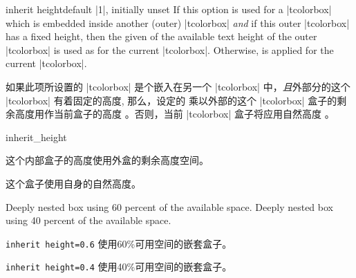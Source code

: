 \begin{docTcbKey}[][doc new={2017-06-28}]{inherit height}{}{default |1|, initially unset}
If this option is used for a |tcolorbox| which is embedded inside
another (outer) |tcolorbox| \emph{and} if this outer |tcolorbox| has
a fixed height, then the given  of the available text height
of the outer |tcolorbox| is used as  for the current
|tcolorbox|.
Otherwise,  is applied for the current
|tcolorbox|.

如果此项所设置的 |tcolorbox| 是个嵌入在另一个%
|tcolorbox| 中，\emph{且}外部分的这个 |tcolorbox| 有着固定的高度, 那么，设定的  乘以外部的这个 |tcolorbox| 盒子的剩余高度用作当前盒子的高度 。否则，当前 |tcolorbox| 盒子将应用自然高度  。

\begin{exdispExample}{inherit_height}

\begin{tcolorbox}[title=外部盒子指定高度为4cm,height=4cm]
\begin{tcolorbox}[title=Inner box,nobeforeafter,inherit height]
这个内部盒子的高度使用外盒的剩余高度空间。
\end{tcolorbox}
\end{tcolorbox}

\begin{tcolorbox}[title=外部盒子使用自然高度]
\begin{tcolorbox}[title=Inner box,nobeforeafter,inherit height]
这个盒子使用自身的自然高度。
\end{tcolorbox}
\end{tcolorbox}

Deeply nested box using 60 percent of the available space.
Deeply nested box using 40 percent of the available space.
\begin{tcolorbox}[title=外部盒子指定高度为5cm,height=5cm]
\begin{tcolorbox}[title=内部盒子,nobeforeafter,inherit height]
\begin{tcolorbox}[colframe=red,beforeafter skip=0pt,inherit height=0.6]
\verb|inherit height=0.6|    使用60\%可用空间的嵌套盒子。
\end{tcolorbox}
\begin{tcolorbox}[colframe=red,beforeafter skip=0pt,inherit height=0.4]
\verb|inherit height=0.4|    使用40\%可用空间的嵌套盒子。
\end{tcolorbox}
\end{tcolorbox}
\end{tcolorbox}
\end{exdispExample}
\end{docTcbKey}





